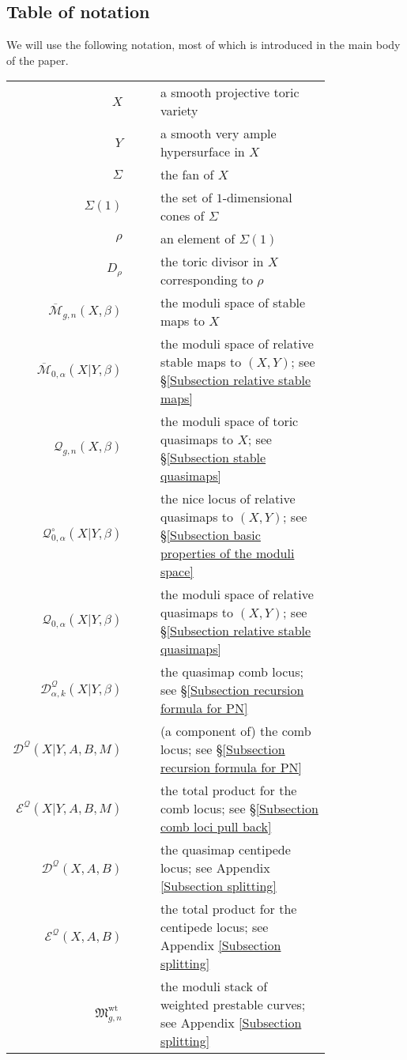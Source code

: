\documentclass[11pt]{amsart}
\newcommand{\M}[4]{\overline{\mathcal{M}}_{#1,#2}(#3,#4)}
\newcommand{\Q}[4]{\mathcal{Q}_{#1,#2}(#3,#4)}
\newcommand{\MM}{\mathfrak M}
\theoremstyle{definition}
\theoremstyle{definition}
\begin{document}
\subsection{Table of notation} We will use the following notation, most of which is introduced in the main body of the paper.
\begin{longtabu}{r c c p{0.8\linewidth}}
$X$ & & & a smooth projective toric variety \\
$Y$ & & & a smooth very ample hypersurface in $X$ \\
$\Sigma$ & & & the fan of $X$ \\
$\Sigma(1)$ & & & the set of $1$-dimensional cones of $\Sigma$ \\
$\rho$ & & & an element of $\Sigma(1)$ \\
$D_\rho$ & & & the toric divisor in $X$ corresponding to $\rho$ \\
$\M{g}{n}{X}{\beta}$ & & & the moduli space of stable maps to $X$ \\
$\M{0}{\alpha}{X|Y}{\beta}$ & & & the moduli space of relative stable maps to $(X,Y)$; see \S \ref{Subsection relative stable maps} \\
$\Q{g}{n}{X}{\beta}$ & & & the moduli space of toric quasimaps to $X$; see \S \ref{Subsection stable quasimaps} \\
$\mathcal{Q}^{\circ}_{0,\alpha}(X|Y,\beta)$ & & & the nice locus of relative quasimaps to $(X,Y)$; see \S \ref{Subsection basic properties of the moduli space} \\
$\Q{0}{\alpha}{X|Y}{\beta}$ & & & the moduli space of relative quasimaps to $(X,Y)$; see \S \ref{Subsection relative stable quasimaps} \\
$\mathcal{D}^{\mathcal{Q}}_{\alpha,k}(X|Y,\beta)$ & & & the quasimap comb locus; see \S \ref{Subsection recursion formula for PN} \\
$\mathcal{D}^{\mathcal{Q}}(X|Y,A,B,M)$ & & & (a component of) the comb locus; see \S \ref{Subsection recursion formula for PN} \\
$\mathcal{E}^{\mathcal{Q}}(X|Y,A,B,M)$ & & & the total product for the comb locus; see \S \ref{Subsection comb loci pull back} \\
$\mathcal{D}^{\mathcal{Q}}(X,A,B)$ & & & the quasimap centipede locus; see Appendix \ref{Subsection splitting} \\
$\mathcal{E}^{\mathcal{Q}}(X,A,B)$ & & & the total product for the centipede locus; see Appendix \ref{Subsection splitting} \\
$\MM^{\operatorname{wt}}_{g,n}$ & & & the moduli stack of weighted prestable curves; see Appendix \ref{Subsection splitting} \\

\end{longtabu}
\end{document}
